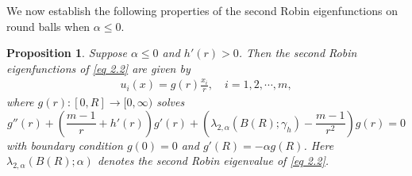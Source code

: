 \documentclass[11pt,leqno]{amsart}
\newtheorem{proposition}{Proposition}[section]
\def\a{\alpha}
\def\l{\lambda}
\numberwithin{equation}{section}
\begin{document}
We now establish the following properties of the second Robin eigenfunctions on round balls when $\a\le 0$.
\begin{proposition}\label{prop 2.3}
Suppose $\a\le 0$ and $h'(r)>0$. Then the second Robin eigenfunctions of \eqref{eq 2.2} are given by 
\begin{align*}
u_i(x)=g(r) \frac{x_i}{r},\quad  i=1,2, \cdots,m,
\end{align*}
where $g(r):[0, R]\rightarrow [0,\infty)$ solves  
\begin{equation}\label{eq 2.11}
g''(r)+(\frac {m-1} {r}+h'(r)) g'(r)+\left(\l_{2,\a}(B(R); \gamma_h)-\frac {m-1} {r^2}\right) g(r)=0
\end{equation}
with boundary condition $g(0)=0$ and $g'(R)=-\a g(R)$. Here $\l_{2, \a}(B(R);\a)$ denotes the second Robin eigenvalue of \eqref{eq 2.2}. 
\end{proposition}
\end{document}
